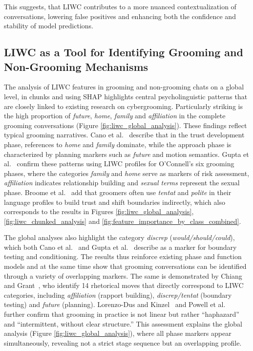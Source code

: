 This suggests, that LIWC contributes to a more nuanced contextualization of conversations, lowering false positives and enhancing both the confidence and stability of model predictions.



\subsection{LIWC as a Tool for Identifying Grooming and Non-Grooming Mechanisms}

The analysis of LIWC features in grooming and non-grooming chats on a global level, in chunks and using SHAP highlights central psycholinguistic patterns that are closely linked to existing research on cybergrooming. Particularly striking is the high proportion of \textit{future}, \textit{home}, \textit{family} and \textit{affiliation} in the complete grooming conversations (Figure \ref{fig:liwc_global_analysis}). These findings reflect typical grooming narratives. Cano et al.~\cite{Cano2014} describe that in the trust development phase, references to \textit{home} and \textit{family} dominate, while the approach phase is characterized by planning markers such as \textit{future} and motion semantics. Gupta et al.~\cite{gupta2012characterizingpedophileconversationsinternet} confirm these patterns using LIWC profiles for O’Connell’s six grooming phases, where the categories \textit{family} and \textit{home} serve as markers of risk assessment, \textit{affiliation} indicates relationship building and \textit{sexual terms} represent the sexual phase. Broome et al.~\cite{broome2020psycholinguistic} add that groomers often use \textit{tentat} and \textit{polite} in their language profiles to build trust and shift boundaries indirectly, which also corresponds to the results in Figures \ref{fig:liwc_global_analysis}, \ref{fig:liwc_chunked_analysis} and \ref{fig:feature_importance_by_class_combined}.

The global analyses also highlight the category \textit{discrep} (\textit{would/should/could}), which both Cano et al.~\cite{Cano2014} and Gupta et al.~\cite{gupta2012characterizingpedophileconversationsinternet} describe as a marker for boundary testing and conditioning. The results thus reinforce existing phase and function models and at the same time show that grooming conversations can be identified through a variety of overlapping markers. The same is demonstrated by Chiang and Grant~\cite{chiangandgrant2017online}, who identify 14 rhetorical moves that directly correspond to LIWC categories, including \textit{affiliation} (rapport building), \textit{discrep/tentat} (boundary testing) and \textit{future} (planning). Lorenzo-Dus and Kinzel~\cite{LorenzoDus2019} and Powell et al.~\cite{powell2021online} further confirm that grooming in practice is not linear but rather “haphazard” and “intermittent, without clear structure.” This assessment explains the global analysis (Figure \ref{fig:liwc_global_analysis}), where all phase markers appear simultaneously, revealing not a strict stage sequence but an overlapping profile.

